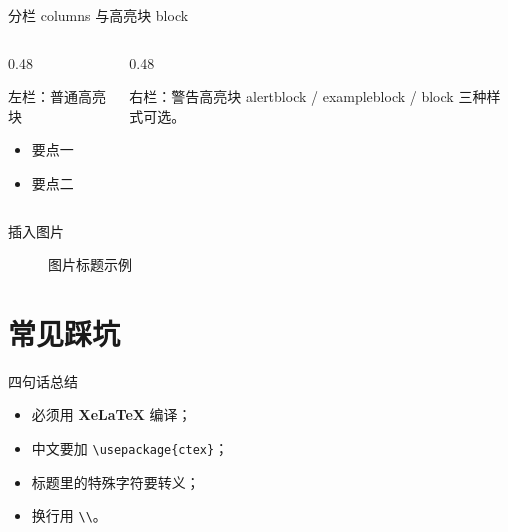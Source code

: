 \documentclass[aspectratio=169, 11pt]{beamer}   %
\begin{document}
\begin{frame}{分栏 columns 与高亮块 block}
    \begin{columns}[T]           %
        \begin{column}{0.48\textwidth}
            \begin{block}{左栏：普通高亮块}
                \begin{itemize}
                    \item 要点一
                    \item 要点二
                \end{itemize}
            \end{block}
        \end{column}
        \begin{column}{0.48\textwidth}
            \begin{alertblock}{右栏：警告高亮块}
                alertblock / exampleblock / block 三种样式可选。
            \end{alertblock}
        \end{column}
    \end{columns}
\end{frame}

\begin{frame}{插入图片}
    \begin{figure}
        \centering
        \caption{图片标题示例}
    \end{figure}
\end{frame}

\section{常见踩坑}

\begin{frame}{四句话总结}
    \begin{itemize}
        \item 必须用 \textbf{XeLaTeX} 编译；
        \item 中文要加 \texttt{\textbackslash usepackage\{ctex\}}；
        \item 标题里的特殊字符要转义；
        \item 换行用 \texttt{\textbackslash\textbackslash}。
    \end{itemize}
\end{frame}
\end{document}
